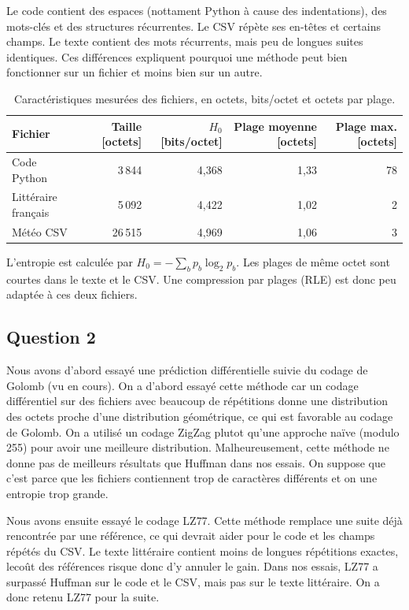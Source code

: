 \documentclass[12pt,letterpaper]{article}
\begin{document}
Le code contient des espaces (nottament Python à cause des indentations), des mots-clés et des structures récurrentes. Le CSV répète ses en-têtes et certains champs. Le texte contient des mots récurrents, mais peu de longues suites identiques. Ces différences expliquent pourquoi une méthode peut bien fonctionner sur un fichier et moins bien sur un autre.

\begin{table}[H]
    \centering
    \caption{Caractéristiques mesurées des fichiers, en octets, bits/octet et octets par plage.}
    \label{tab:analyse}
    \small
    \begin{tabular}{lrrrr}
        \toprule
        Fichier & Taille [octets] & $H_0$ [bits/octet] & Plage moyenne [octets] & Plage max. [octets] \\
        \midrule
        Code Python & 3\,844 & 4,368 & 1,33 & 78 \\
        Littéraire français & 5\,092 & 4,422 & 1,02 & 2 \\
        Météo CSV & 26\,515 & 4,969 & 1,06 & 3 \\
        \bottomrule
    \end{tabular}
\end{table}

L'entropie est calculée par $H_0=-\sum_b p_b\log_2p_b$. Les plages de même octet sont courtes dans le texte et le CSV. Une compression par plages (RLE) est donc peu adaptée à ces deux fichiers.

\subsection{Question 2}
Nous avons d'abord essayé une prédiction différentielle suivie du codage de Golomb (vu en cours). On a d'abord essayé cette méthode car un codage différentiel sur des fichiers avec beaucoup de répétitions donne une distribution des octets proche d'une distribution géométrique, ce qui est favorable au codage de Golomb. On a utilisé un codage ZigZag plutot qu'une approche naïve (modulo 255) pour avoir une meilleure distribution. Malheureusement, cette méthode ne donne pas de meilleurs résultats que Huffman dans nos essais. On suppose que c'est parce que les fichiers contiennent trop de caractères différents et on une entropie trop grande.

Nous avons ensuite essayé le codage LZ77. Cette méthode remplace une suite déjà rencontrée par une référence, ce qui devrait aider pour le code et les champs répétés du CSV. Le texte littéraire contient moins de longues répétitions exactes, lecoût des références risque donc d'y annuler le gain. Dans nos essais, LZ77 a surpassé Huffman sur le code et le CSV, mais pas sur le texte littéraire. On a donc retenu LZ77 pour la suite.
\end{document}
